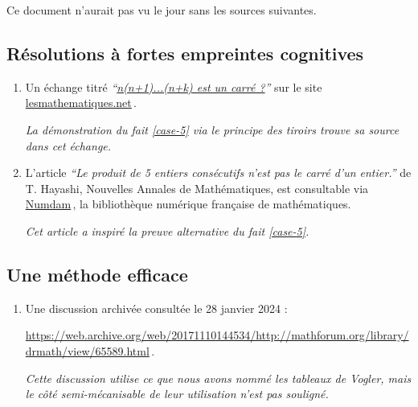	



Ce document n'aurait pas vu le jour sans les sources suivantes.




\subsection{Résolutions à fortes empreintes cognitives}

\leavevmode
\smallskip

\begin{enumerate}
	\item Un échange titré \emph{\enquote{\href{https://les-mathematiques.net/vanilla/discussion/comment/351293}{n(n+1)...(n+k) est un carré ?}}} sur le site \url{lesmathematiques.net}\,.
	
	\smallskip
	\noindent
	\emph{La démonstration du fait \ref{case-5}  via le principe des tiroirs trouve sa source dans cet échange.}


	\item L'article \emph{\enquote{Le produit de 5 entiers consécutifs n'est pas le carré d'un entier.}} de T. Hayashi, Nouvelles Annales de Mathématiques, est consultable via \href{https://numdam.org}{Numdam}\,, la bibliothèque numérique française de mathématiques.
	
	\smallskip
	\noindent
	\emph{Cet article a inspiré la preuve alternative du fait \ref{case-5}.}
\end{enumerate}




\subsection{Une méthode efficace}

\leavevmode
\smallskip

\begin{enumerate}
	\item Une discussion archivée consultée le 28 janvier 2024 : 
	
	\noindent
	\url{https://web.archive.org/web/20171110144534/http://mathforum.org/library/drmath/view/65589.html}\,.
	
	\smallskip
	\noindent
	\emph{Cette discussion utilise ce que nous avons nommé les tableaux de Vogler, mais le côté semi-mécanisable de leur utilisation n'est pas souligné.}
\end{enumerate}